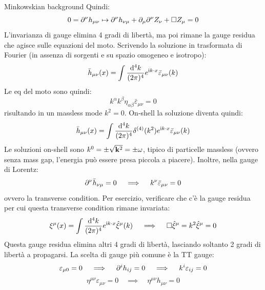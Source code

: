 \begin{example}{Minkowskian background}{}
  Quindi:
  \begin{equation*}
    0 = \partial^\nu h_{\mu \nu} \mapsto \partial^\nu h_{\nu \mu} + \partial_\mu \partial^\nu Z_\nu + \Box Z_\mu = 0
  \end{equation*}
  L'invarianza di gauge elimina 4 gradi di libertà, ma poi rimane la gauge residua che agisce sulle equazioni del moto. Scrivendo la soluzione in trasformata di Fourier (in assenza di sorgenti e su spazio omogeneo e isotropo):
  \begin{equation}
    \bar{h}_{\mu \nu}(x) = \int \frac{\mathrm{d}^4k}{(2\pi)^4} e^{\mathrm{i} k \cdot x} \bar{\varepsilon}_{\mu \nu}(k)
  \end{equation}
  Le eq del moto sono quindi:
  \begin{equation*}
    k^\alpha k^\beta \eta_{\alpha \beta} \bar{\varepsilon}_{\mu \nu} = 0
  \end{equation*}
  risultando in un massless mode $ k^2 = 0 $. On-shell la soluzione diventa quindi:
  \begin{equation}
    \bar{h}_{\mu \nu}(x) = \int \frac{\mathrm{d}^4k}{(2\pi)^4} \delta^{(4)}(k^2) e^{\mathrm{i} k \cdot x} \bar{\varepsilon}_{\mu \nu}(k)
  \end{equation}
  Le soluzioni on-shell sono $ k^0 = \pm \sqrt{\mathbf{k}^2} = \pm \omega $, tipico di particelle massless (ovvero senza mass gap, l'energia può essere presa piccola a piacere). Inoltre, nella gauge di Lorentz:
  \begin{equation*}
    \partial^\nu \bar{h}_{\nu \mu} = 0
    \quad \implies \quad
    k^\nu \bar{\varepsilon}_{\mu \nu} = 0
  \end{equation*}
  ovvero la transverse condition. Per esercizio, verificare che c'è la gauge residua per cui questa transverse condition rimane invariata:
  \begin{equation*}
    \xi^\mu(x) = \int \frac{\mathrm{d}^4k}{(2\pi)^4} e^{\mathrm{i} k \cdot x} \hat{\xi}^\mu(k)
    \quad \implies \quad
    \Box \hat{\xi}^\mu = k^2 \hat{\xi}^\mu = 0
  \end{equation*}
  Questa gauge residua elimina altri 4 gradi di libertà, lasciando soltanto 2 gradi di libertà a propagarsi. La scelta di gauge più comune è la TT gauge:
  \begin{equation*}
    \varepsilon_{\mu 0} = 0
    \quad \implies \quad
    \partial^i h_{ij} = 0
    \quad \implies \quad
    k^i \varepsilon_{ij} = 0
  \end{equation*}
  \begin{equation*}
    \eta^{\mu \nu} \varepsilon_{\mu \nu} = 0
    \quad \implies \quad
    \eta^{\mu \nu} h_{\mu \nu} = 0

\end{equation*}
\end{example}
